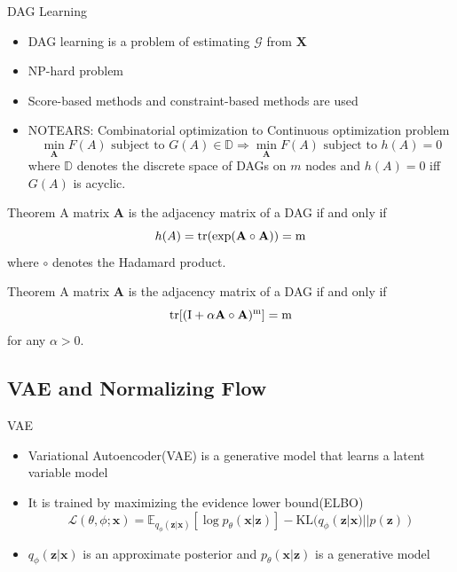 \documentclass{beamer}
\begin{document}
\begin{frame}[allowframebreaks]{DAG Learning}
    \begin{itemize}
        \item DAG learning is a problem of estimating $\mathcal G$ from $\mathbf X$
        \item NP-hard problem \cite{ChickeringNPhard}
        \item Score-based methods \cite{Spirtes2000} and constraint-based methods \cite{ChickeringGES} are used
        \item NOTEARS\cite{zheng2018dags}: Combinatorial optimization to Continuous optimization problem
        \begin{equation*}
            \min_{\mathbf{A}} F(A) \text{ subject to } G(A) \in \mathbb{D} \Rightarrow 
            \min_{\mathbf{A}} F(A) \text{ subject to } h(A)=0
        \end{equation*}
        where $\mathbb D$ denotes the discrete space of DAGs on $m$ nodes and $h(A)=0$ iff $G(A)$ is acyclic.
    \end{itemize}

    \begin{block}{Theorem}
        A matrix $\mathbf A$ is the adjacency matrix of a DAG if and only if
        \begin{equation*}
            h(A) = \rm{tr}(\exp(\mathbf A \circ \mathbf A)) = m
        \end{equation*}
        where $\circ$ denotes the Hadamard product.
    \end{block}
    \begin{block}{Theorem}
        A matrix $\mathbf A$ is the adjacency matrix of a DAG if and only if
        \begin{equation*}
            \rm{tr}[(I + \alpha \mathbf A \circ \mathbf A)^m] = m
        \end{equation*}
        for any $\alpha>0$.
    \end{block}
\end{frame}

\subsection{VAE and Normalizing Flow}

\begin{frame}{VAE}
    \begin{itemize}
        \item Variational Autoencoder(VAE) is a generative model that learns a latent variable model
        \item It is trained by maximizing the evidence lower bound(ELBO)
        \begin{equation*}
            \mathcal L(\theta, \phi; \mathbf x) = \mathbb E_{q_\phi(\mathbf z | \mathbf x)}[\log p_\theta(\mathbf x | \mathbf z)] - \text{KL}(q_\phi(\mathbf z | \mathbf x) || p(\mathbf z))
        \end{equation*}
        \item $q_\phi(\mathbf z | \mathbf x)$ is an approximate posterior and $p_\theta(\mathbf x | \mathbf z)$ is a generative model
    \end{itemize}
\end{frame}
\end{document}

